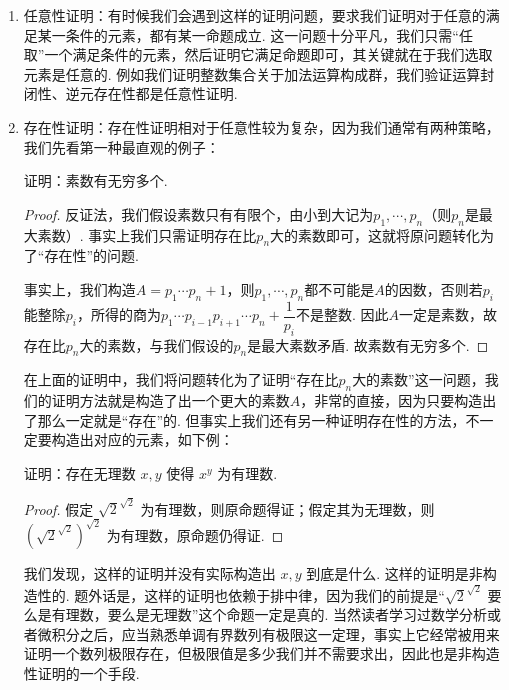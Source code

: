 \begin{enumerate}
    \item 任意性证明：有时候我们会遇到这样的证明问题，要求我们证明对于任意的满足某一条件的元素，都有某一命题成立. 这一问题十分平凡，我们只需``任取''一个满足条件的元素，然后证明它满足命题即可，其关键就在于我们选取元素是任意的. 例如我们证明整数集合关于加法运算构成群，我们验证运算封闭性、逆元存在性都是任意性证明.

    \item 存在性证明：存在性证明相对于任意性较为复杂，因为我们通常有两种策略，我们先看第一种最直观的例子：
    \begin{example*}
        证明：素数有无穷多个.
    \end{example*}
    \begin{proof}
        反证法，我们假设素数只有有限个，由小到大记为$p_1,\cdots,p_n$（则$p_n$是最大素数）. 事实上我们只需证明存在比$p_n$大的素数即可，这就将原问题转化为了``存在性''的问题.

        事实上，我们构造$A=p_1\cdots p_n+1$，则$p_1,\cdots,p_n$都不可能是$A$的因数，否则若$p_i$能整除$p_i$，所得的商为$p_1\cdots p_{i-1}p_{i+1}\cdots p_n+\dfrac{1}{p_i}$不是整数. 因此$A$一定是素数，故存在比$p_n$大的素数，与我们假设的$p_n$是最大素数矛盾. 故素数有无穷多个.
    \end{proof}

    在上面的证明中，我们将问题转化为了证明``存在比$p_n$大的素数''这一问题，我们的证明方法就是构造了出一个更大的素数$A$，非常的直接，因为只要构造出了那么一定就是``存在''的. 但事实上我们还有另一种证明存在性的方法，不一定要构造出对应的元素，如下例：
    \begin{example*}
        证明：存在无理数 $x, y$ 使得 $x^y$ 为有理数.
    \end{example*}
    \begin{proof}
        假定 $\sqrt{2}^{\sqrt{2}}$ 为有理数，则原命题得证；假定其为无理数，则 $\left(\sqrt{2}^{\sqrt{2}}\right)^{\sqrt{2}}$ 为有理数，原命题仍得证.
    \end{proof}


    我们发现，这样的证明并没有实际构造出 $x, y$ 到底是什么. 这样的证明是非构造性的. 题外话是，这样的证明也依赖于排中律，因为我们的前提是“$\sqrt{2}^{\sqrt{2}}$ 要么是有理数，要么是无理数”这个命题一定是真的. 当然读者学习过数学分析或者微积分之后，应当熟悉单调有界数列有极限这一定理，事实上它经常被用来证明一个数列极限存在，但极限值是多少我们并不需要求出，因此也是非构造性证明的一个手段.


\end{enumerate}
